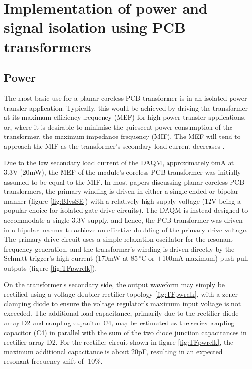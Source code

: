\documentclass[conference]{IEEEtran}
\begin{document}
\section{Implementation of power and signal isolation using PCB transformers}

	\subsection{Power}
	The most basic use for a planar coreless PCB transformer is in an isolated power transfer application.  Typically, this would be achieved by driving the transformer at its maximum efficiency frequency (MEF) for high power transfer applications, or, where it is desirable to minimise the quiescent power consumption of the transformer, the maximum impedance frequency (MIF).  The MEF will tend to approach the MIF as the transformer's secondary load current decreases \cite{TangHuiFundamental}. 
	 
	Due to the low secondary load current of the DAQM, approximately 6mA at 3.3V (20mW), the MEF of the module's coreless PCB transformer was initially assumed to be equal to the MIF.  In most papers discussing planar coreless PCB transformers, the primary winding is driven in either a single-ended or bipolar manner (figure \ref{fig:BIvsSE}) with a relatively high supply voltage (12V being a popular choice for isolated gate drive circuits).  The DAQM is instead designed to accommodate a single 3.3V supply, and hence, the PCB transformer was driven in a bipolar manner to achieve an effective doubling of the primary drive voltage.  The primary drive circuit uses a simple relaxation oscillator for the resonant frequency generation, and the transformer's winding is driven directly by the Schmitt-trigger's high-current (170mW at 85$ \,^{\circ} $C or $\pm$100mA maximum) push-pull outputs (figure \ref{fig:TFpwrclk}).
	
	On the transformer's secondary side, the output waveform may simply be rectified using a voltage-doubler rectifier topology \ref{fig:TFpwrclk}, with a zener clamping diode to ensure the voltage regulator's maximum input voltage is not exceeded.  The additional load capacitance, primarily due to the rectifier diode array D2 and coupling capacitor C4, may be estimated as the series coupling capacitor (C4) in parallel with the sum of the two diode junction capacitances in rectifier array D2.  For the rectifier circuit shown in figure \ref{fig:TFpwrclk}, the maximum additional capacitance is about 20pF, resulting in an expected resonant frequency shift of -10\%.
	
\end{document}
